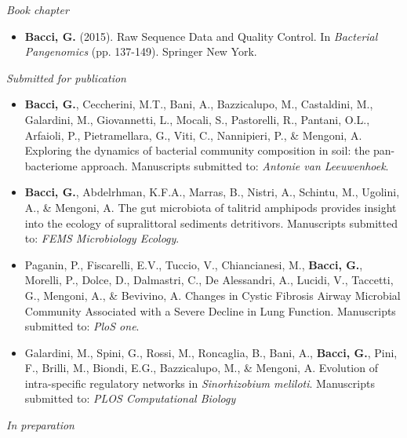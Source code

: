 \noindent \textit{Book chapter}
\begin{itemize}

\item \textbf{Bacci, G.} (2015). Raw Sequence Data and Quality Control. In \textit{Bacterial Pangenomics} (pp. 137-149). Springer New York.

\end{itemize}


\noindent \textit{Submitted for publication}

\begin{itemize}

\item \textbf{Bacci, G.}, Ceccherini, M.T., Bani, A., Bazzicalupo, M., Castaldini, M., Galardini, M., Giovannetti, L., Mocali, S., Pastorelli, R., Pantani, O.L., Arfaioli, P., Pietramellara, G., Viti, C., Nannipieri, P., \& Mengoni, A. Exploring the dynamics of bacterial community composition in soil: the pan-bacteriome approach. Manuscripts submitted to: \textit{Antonie van Leeuwenhoek}.

\item \textbf{Bacci, G.}, Abdelrhman, K.F.A., Marras, B., Nistri, A., Schintu, M., Ugolini, A., \& Mengoni, A. The gut microbiota of talitrid amphipods provides insight into the ecology of supralittoral sediments detritivors. Manuscripts submitted to: \textit{FEMS Microbiology Ecology}.

\item Paganin, P., Fiscarelli, E.V., Tuccio, V., Chiancianesi, M., \textbf{Bacci, G.}, Morelli, P., Dolce, D., Dalmastri, C., De Alessandri, A., Lucidi, V., Taccetti, G., Mengoni, A., \& Bevivino, A. Changes in Cystic Fibrosis Airway Microbial Community Associated
with a Severe Decline in Lung Function. Manuscripts submitted to: \textit{PloS one}.

\item Galardini, M., Spini, G., Rossi, M., Roncaglia, B., Bani, A., \textbf{Bacci, G.}, Pini, F., Brilli, M., Biondi, E.G., Bazzicalupo, M., \& Mengoni, A. Evolution of intra-specific regulatory networks in \textit{Sinorhizobium meliloti}. Manuscripts submitted to: \textit{PLOS Computational Biology}

\end{itemize}


\textit{In preparation}

